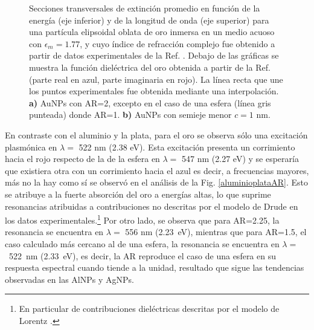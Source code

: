 \begin{figure}[h]
	\quad%
	\caption{Secciones transversales de extinción promedio en función de la energía (eje inferior) y de la longitud de onda (eje superior) para una partícula elipsoidal oblata de oro inmersa en un medio acuoso con $\epsilon_m=1.77$, y cuyo índice de refracción complejo fue obtenido a partir de datos experimentales de la Ref. \cite{Plata}. Debajo de las gráficas se muestra la función dieléctrica del oro obtenida a partir de la Ref. \cite{Plata} (parte real en azul, parte imaginaria en rojo). La línea recta que une los puntos experimentales fue obtenida mediante una interpolación. \textbf{a)} AuNPs con AR=2, excepto en el caso de una esfera (línea gris punteada) donde AR=1. \textbf{b)} AuNPs con semieje menor $c=1$ nm.}\label{oro}
\end{figure}

En contraste con el aluminio y la plata, para el oro se observa sólo una excitación plasmónica en $\lambda=$ 522 nm (2.38 eV). Esta excitación presenta un corrimiento hacia el rojo respecto de la de la esfera en $\lambda=$ 547 nm (2.27 eV) y se esperaría que existiera otra con un corrimiento hacia el azul es decir, a frecuencias mayores, más no la hay como sí se observó en el análisis de la Fig. \ref{aluminioplataAR}. Esto se atribuye a la fuerte absorción del oro a energías altas, lo que suprime resonancias atribuidas a contribuciones no descritas por el modelo de Drude en los datos experimentales.\footnote{En particular de contribuciones dieléctricas descritas por el modelo de Lorentz \cite{Plasmonics}.} Por otro lado, se observa que para AR=2.25, la resonancia se encuentra en $\lambda=$ 556 nm (2.23~eV), mientras que para AR=1.5, el caso calculado más cercano al de una esfera, la resonancia se encuentra en $\lambda=$~522~nm (2.33~eV), es decir, la AR reproduce el caso de una esfera en su respuesta espectral cuando tiende a la unidad, resultado que sigue las tendencias observadas en las AlNPs y AgNPs.\\

